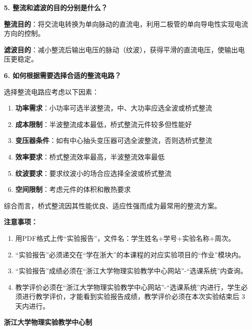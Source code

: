 \documentclass[10pt,a4paper]{ctexart}
\newcommand{\sihao}{\fontsize{14pt}{18pt}\selectfont}
\newcommand{\xiaosi}{\fontsize{12pt}{16pt}\selectfont}
\begin{document}
    \textbf{5. 整流和滤波的目的分别是什么？}
    
    \textbf{整流目的}：将交流电转换为单向脉动的直流电，利用二极管的单向导电性实现电流方向的控制。
    
    \textbf{滤波目的}：减小整流后输出电压的脉动（纹波），获得平滑的直流电压，使输出电压更稳定。
    
    \textbf{6. 如何根据需要选择合适的整流电路？}
    
    选择整流电路应考虑以下因素：
    \begin{enumerate}
        \item \textbf{功率需求}：小功率可选半波整流，中、大功率应选全波或桥式整流
        \item \textbf{成本限制}：半波整流成本最低，桥式整流元件较多但性能好
        \item \textbf{变压器条件}：如有中心抽头变压器可选全波整流，否则选桥式整流
        \item \textbf{效率要求}：桥式整流效率最高，半波整流效率最低
        \item \textbf{纹波要求}：要求纹波小的场合应选择全波或桥式整流
        \item \textbf{空间限制}：考虑元件的体积和散热要求
    \end{enumerate}
    综合而言，桥式整流因其性能优良、适应性强而成为最常用的整流方案。

\newpage

\sihao\textbf{注意事项：}
\xiaosi
\begin{enumerate}
    \item 用PDF格式上传“实验报告”，文件名：学生姓名+学号+实验名称+周次。
    \item  “实验报告”必须递交在“学在浙大”的本课程的对应实验项目的“作业”模块内。
    \item  “实验报告”成绩必须在“浙江大学物理实验教学中心网站”-“选课系统”内查询。
    \item 教学评价必须在“浙江大学物理实验教学中心网站”-“选课系统”内进行，学生必须进行教学评价，才能看到实验报告成绩，教学评价必须在本次实验结束后 3 天内进行。
\end{enumerate}

\vspace{1cm}
\xiaosi\centering \textbf{浙江大学物理实验教学中心制}
\end{document}
